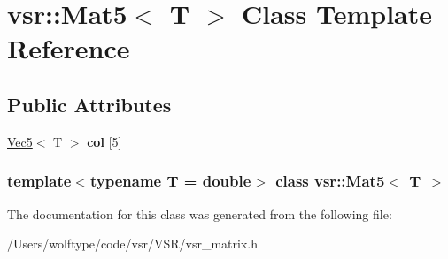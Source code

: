 \hypertarget{classvsr_1_1_mat5}{\section{vsr\-:\-:Mat5$<$ T $>$ Class Template Reference}
\label{classvsr_1_1_mat5}
}
\subsection*{Public Attributes}
\begin{DoxyCompactItemize}
\item 
\hypertarget{classvsr_1_1_mat5_ac777a4d4a48428ef04e59c339a8214ba}{\hyperlink{classvsr_1_1_vec5}{Vec5}$<$ T $>$ {\bfseries col} \mbox{[}5\mbox{]}}\label{classvsr_1_1_mat5_ac777a4d4a48428ef04e59c339a8214ba}

\end{DoxyCompactItemize}
\subsubsection*{template$<$typename T = double$>$ class vsr\-::\-Mat5$<$ T $>$}



The documentation for this class was generated from the following file\-:\begin{DoxyCompactItemize}
\item 
/\-Users/wolftype/code/vsr/\-V\-S\-R/vsr\-\_\-matrix.\-h\end{DoxyCompactItemize}
